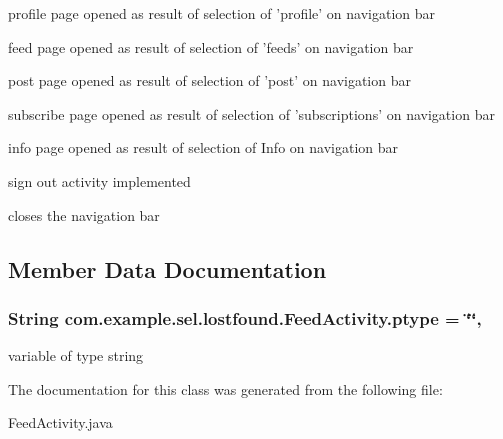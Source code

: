 profile page opened as result of selection of 'profile' on navigation bar

feed page opened as result of selection of 'feeds' on navigation bar

post page opened as result of selection of 'post' on navigation bar

subscribe page opened as result of selection of 'subscriptions' on navigation bar

info page opened as result of selection of Info on navigation bar

sign out activity implemented

closes the navigation bar 

\subsection{Member Data Documentation}
\hypertarget{classcom_1_1example_1_1sel_1_1lostfound_1_1FeedActivity_a485e807a263274d664ce60fae23ebb45}{
\subsubsection[{ptype}]{\setlength{\rightskip}{0pt plus 5cm}String com.\-example.\-sel.\-lostfound.\-Feed\-Activity.\-ptype = \char`\"{}\char`\"{}\hspace{0.3cm}{\ttfamily [static]}, {\ttfamily [protected]}}}\label{classcom_1_1example_1_1sel_1_1lostfound_1_1FeedActivity_a485e807a263274d664ce60fae23ebb45}
variable of type string 

The documentation for this class was generated from the following file\-:\begin{DoxyCompactItemize}
\item 
Feed\-Activity.\-java\end{DoxyCompactItemize}
